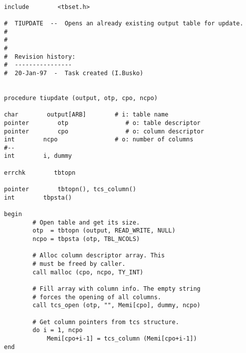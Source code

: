 \newpage
{}
\begin{verbatim}

include        <tbset.h>

#  TIUPDATE  --  Opens an already existing output table for update.
#
#
#
#  Revision history:
#  ----------------
#  20-Jan-97  -  Task created (I.Busko)


procedure tiupdate (output, otp, cpo, ncpo)

char        output[ARB]        # i: table name
pointer        otp                # o: table descriptor
pointer        cpo                # o: column descriptor
int        ncpo                # o: number of columns
#--
int        i, dummy

errchk        tbtopn

pointer        tbtopn(), tcs_column()
int        tbpsta()

begin
        # Open table and get its size.
        otp  = tbtopn (output, READ_WRITE, NULL)
        ncpo = tbpsta (otp, TBL_NCOLS)

        # Alloc column descriptor array. This
        # must be freed by caller.
        call malloc (cpo, ncpo, TY_INT)

        # Fill array with column info. The empty string
        # forces the opening of all columns.
        call tcs_open (otp, "", Memi[cpo], dummy, ncpo)

        # Get column pointers from tcs structure.
        do i = 1, ncpo
            Memi[cpo+i-1] = tcs_column (Memi[cpo+i-1])
end
\end{verbatim}
\newpage
{}
